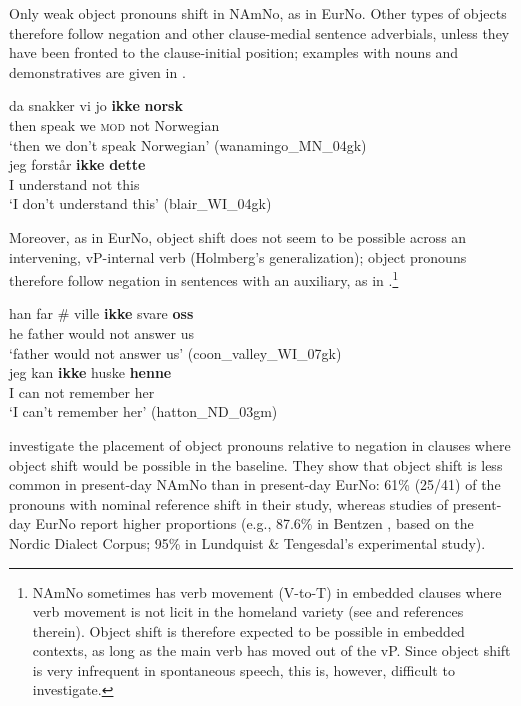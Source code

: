 \documentclass[output=paper]{langscibook}
\begin{document}
Only weak object pronouns shift in NAmNo, as in EurNo. Other types of objects therefore follow negation and other clause-medial sentence adverbials, unless they have been fronted to the clause-initial position; examples with nouns and demonstratives are given in .

\ea%
    \label{ex:larsson:21}
    \ea 
    \gll da snakker vi jo \textbf{ikke} \textbf{norsk}\\
         then speak we \textsc{mod} not Norwegian\\
    \glt ‘then we don’t speak Norwegian’ (wanamingo\_MN\_04gk)\label{ex:larsson:21a}\\
    \ex 
    \gll jeg forstår \textbf{ikke} \textbf{dette}\\
         I understand not this\\
    \glt `I don’t understand this’ (blair\_WI\_04gk)\label{ex:larsson:21b}\\
    \z %
\z

Moreover, as in EurNo, object shift does not seem to be possible across an intervening, vP-internal verb (Holmberg’s generalization); object pronouns therefore follow negation in sentences with an auxiliary, as in .\footnote{NAmNo sometimes has verb movement (V-to-T) in embedded clauses where verb movement is not licit in the homeland variety (see  and references therein). Object shift is therefore expected to be possible in embedded contexts, as long as the main verb has moved out of the vP. Since object shift is very infrequent in spontaneous speech, this is, however, difficult to investigate.}

\ea%
    \label{ex:larsson:22}
    \ea  
    \gll  han far \# ville	\textbf{ikke} svare \textbf{oss} \\
         he father {} would not answer us \\
    \glt ‘father would not answer us’ (coon\_valley\_WI\_07gk)\label{ex:larsson:22a}\\
    \ex 
    \gll jeg kan \textbf{ikke} huske \textbf{{henne}}\\
         I can not remember her\\
    \glt ‘I can’t remember her’ (hatton\_ND\_03gm)\label{ex:larsson:22b}\\
    \z %
\z


\citet{AnderssenWestergaard2020} investigate the placement of object pronouns relative to negation in clauses where object shift would be possible in the baseline. They show that object shift is less common in present-day NAmNo than in present-day EurNo: 61\% (25/41) of the pronouns with nominal reference shift in their study, whereas studies of present-day EurNo report higher proportions (e.g., 87.6\% in Bentzen \citeyear{Bentzen2014a}, based on the Nordic Dialect Corpus; 95\% in Lundquist \& Tengesdal's \citeyear{LundquistTengesdal2022} experimental study). 
\end{document}
